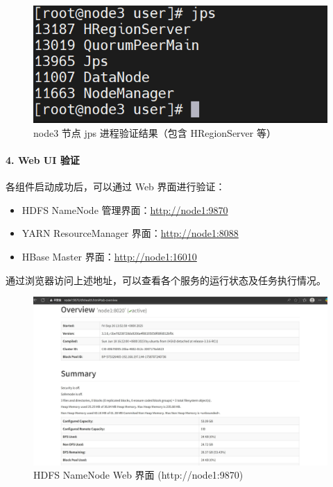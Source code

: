 \documentclass[]{bitreport}
\begin{document}
\begin{figure}[H]
  \centering
  \includegraphics[width=0.8\linewidth]{figures/jps_hbase_node3.png}
  \caption{node3 节点 jps 进程验证结果（包含 HRegionServer 等）}
  \label{fig:jps_hbase_node3}
\end{figure}

\paragraph{4. Web UI 验证}
各组件启动成功后，可以通过 Web 界面进行验证：
\begin{itemize}
  \item HDFS NameNode 管理界面：\url{http://node1:9870}
  \item YARN ResourceManager 界面：\url{http://node1:8088}
  \item HBase Master 界面：\url{http://node1:16010}
\end{itemize}

通过浏览器访问上述地址，可以查看各个服务的运行状态及任务执行情况。

\begin{figure}[H]
  \centering
  \includegraphics[width=0.9\linewidth]{figures/web_hdfs.jpg}
  \caption{HDFS NameNode Web 界面 (http://node1:9870)}
  \label{fig:web_hdfs}
\end{figure}
\end{document}
